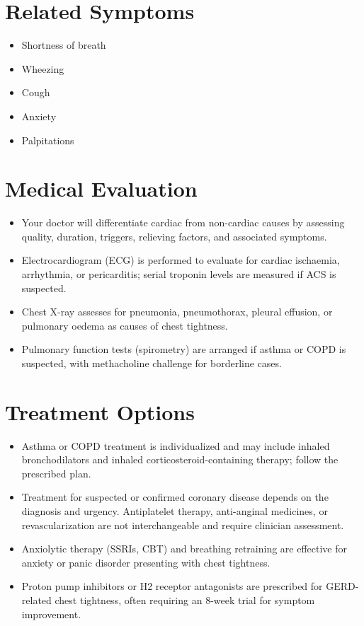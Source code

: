 \section*{Related Symptoms}
\begin{itemize}
  \item Shortness of breath
  \item Wheezing
  \item Cough
  \item Anxiety
  \item Palpitations
\end{itemize}

\section*{Medical Evaluation}
\begin{itemize}
  \item Your doctor will differentiate cardiac from non-cardiac causes by assessing quality, duration, triggers, relieving factors, and associated symptoms.
  \item Electrocardiogram (ECG) is performed to evaluate for cardiac ischaemia, arrhythmia, or pericarditis; serial troponin levels are measured if ACS is suspected.
  \item Chest X-ray assesses for pneumonia, pneumothorax, pleural effusion, or pulmonary oedema as causes of chest tightness.
  \item Pulmonary function tests (spirometry) are arranged if asthma or COPD is suspected, with methacholine challenge for borderline cases.
\end{itemize}

\section*{Treatment Options}
\begin{itemize}
   \item Asthma or COPD treatment is individualized and may include inhaled bronchodilators and inhaled corticosteroid-containing therapy; follow the prescribed plan.
   \item Treatment for suspected or confirmed coronary disease depends on the diagnosis and urgency. Antiplatelet therapy, anti-anginal medicines, or revascularization are not interchangeable and require clinician assessment.
  \item Anxiolytic therapy (SSRIs, CBT) and breathing retraining are effective for anxiety or panic disorder presenting with chest tightness.
  \item Proton pump inhibitors or H2 receptor antagonists are prescribed for GERD-related chest tightness, often requiring an 8-week trial for symptom improvement.
\end{itemize}

